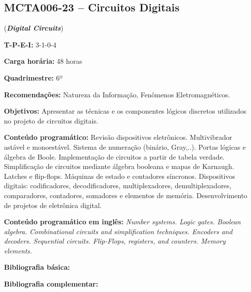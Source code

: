 \documentclass[class=article, crop=false]{standalone}
\begin{document}
\subsection{MCTA006-23 -- Circuitos Digitais}
\label{disc:circ_dig}

(\textbf{\textit{Digital Circuits}})

\begin{center}
    \begin{minipage}{0.85\textwidth}
        \textbf{T-P-E-I:} 3-1-0-4
        
        \textbf{Carga horária:} 48 horas
        
        \textbf{Quadrimestre:} 6º
        
        \textbf{Recomendações:} 
        Natureza da Informação, 
        Fenômenos Eletromagnéticos.
    \end{minipage}
\end{center}

\textbf{Objetivos:}
Apresentar as técnicas e os componentes lógicos discretos utilizados no projeto
de circuitos digitais.

\textbf{Conteúdo programático:}
Revisão dispositivos eletrônicos. 
Multivibrador astável e monoestável. 
Sistema de numeração (binário, Gray,..). 
Portas lógicas e álgebra de Boole. 
Implementação de circuitos a partir de tabela verdade. 
Simplificação de circuitos mediante álgebra booleana e mapas de Karnaugh. 
Latches e flip-flops. 
Máquinas de estado e contadores síncronos. 
Dispositivos digitais: codificadores, decodificadores, multiplexadores,
demultiplexadores, comparadores, contadores, somadores e elementos de memória.
Desenvolvimento de projetos de eletrônica digital.

\textbf{Conteúdo programático em inglês:}
\textit{Number systems. 
Logic gates. 
Boolean algebra. 
Combinational circuits and simplification techniques. 
Encoders and decoders. 
Sequential circuits. 
Flip-Flops, registers, and counters. 
Memory elements.}

\newrefsection
\textbf{Bibliografia básica:}
\nocite{2007-floyd, 2007-tocci, 2008-vahid}
\printbibliography

\newrefsection
\textbf{Bibliografia complementar:}
\nocite{2000-ercegovac, 2006-idoeta, 2005-katz, 2006-wakerly, 2005-agarwal}
\printbibliography
\end{document}
